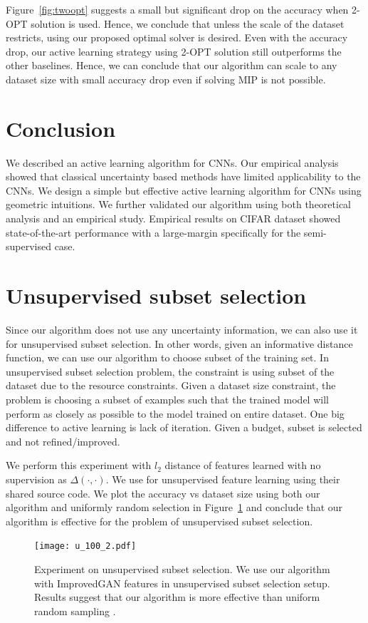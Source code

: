 \documentclass{article}
\begin{document}
Figure~\ref{fig:twoopt} suggests a small but significant drop on the accuracy when 2-OPT solution is used. Hence, we conclude that unless the scale of the dataset restricts, using our proposed optimal solver is desired. %
Even with the accuracy drop, our active learning strategy using 2-OPT solution still outperforms the other baselines. Hence, we can conclude that our algorithm can scale to any dataset size with small accuracy drop even if solving MIP is not possible.

\section{Conclusion}
We described an active learning algorithm for CNNs. Our empirical analysis showed that classical uncertainty based methods have limited applicability to the CNNs. We design a simple but effective active learning algorithm for CNNs using geometric intuitions. We further validated our algorithm using both theoretical analysis and an empirical study. Empirical results on CIFAR\cite{cifar} dataset showed state-of-the-art performance with a large-margin specifically for the semi-supervised case.


 


\appendix

\section{Unsupervised subset selection} 

Since our algorithm does not use any uncertainty information, we can also use it for unsupervised subset selection. In other words, given an informative distance function, we can use our algorithm to choose subset of the training set. In unsupervised subset selection problem, the constraint is using subset of the dataset due to the resource constraints. Given a dataset size constraint, the problem is choosing a subset of examples such that the trained model will perform as closely as possible to the model trained on entire dataset. One big difference to active learning is lack of iteration. Given a budget, subset is selected and not refined/improved.


We perform this experiment with $l_2$ distance of features learned with no supervision as $\Delta(\cdot,\cdot)$. We use \cite{improved_gan} for unsupervised feature learning using their shared source code. We plot the accuracy vs dataset size using both our algorithm and uniformly random selection in Figure~\ref{fig:scat} and conclude that our algorithm is effective for the problem of unsupervised subset selection.  

\begin{figure}
\texttt{[image: u\_100\_2.pdf]}
\caption{Experiment on unsupervised subset selection. We use our algorithm with ImprovedGAN\cite{improved_gan} features in unsupervised subset selection setup. Results suggest that our algorithm is more effective than uniform random sampling .}
\label{fig:scat}
\end{figure}
\end{document}
